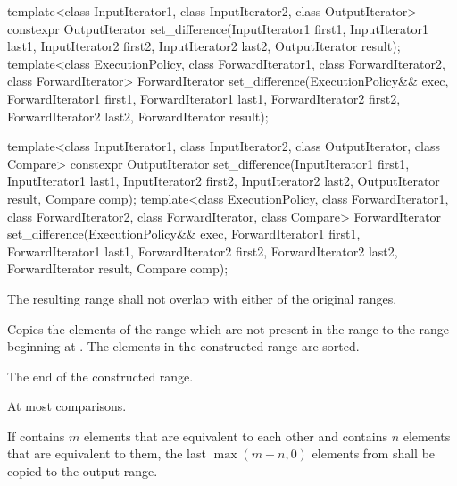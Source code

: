 %
\begin{itemdecl}
template<class InputIterator1, class InputIterator2,
         class OutputIterator>
  constexpr OutputIterator
    set_difference(InputIterator1 first1, InputIterator1 last1,
                   InputIterator2 first2, InputIterator2 last2,
                   OutputIterator result);
template<class ExecutionPolicy, class ForwardIterator1, class ForwardIterator2,
         class ForwardIterator>
  ForwardIterator
    set_difference(ExecutionPolicy&& exec,
                   ForwardIterator1 first1, ForwardIterator1 last1,
                   ForwardIterator2 first2, ForwardIterator2 last2,
                   ForwardIterator result);

template<class InputIterator1, class InputIterator2,
         class OutputIterator, class Compare>
  constexpr OutputIterator
    set_difference(InputIterator1 first1, InputIterator1 last1,
                   InputIterator2 first2, InputIterator2 last2,
                   OutputIterator result, Compare comp);
template<class ExecutionPolicy, class ForwardIterator1, class ForwardIterator2,
         class ForwardIterator, class Compare>
  ForwardIterator
    set_difference(ExecutionPolicy&& exec,
                   ForwardIterator1 first1, ForwardIterator1 last1,
                   ForwardIterator2 first2, ForwardIterator2 last2,
                   ForwardIterator result, Compare comp);
\end{itemdecl}

\begin{itemdescr}
\pnum
\requires
The resulting range shall not overlap with either of the original ranges.

\pnum
\effects
Copies the elements of the range
which are not present in the range
to the range beginning at
.
The elements in the constructed range are sorted.

\pnum
\returns
The end of the constructed range.

\pnum
\complexity
At most
comparisons.

\pnum
\remarks
If
contains $m$
elements that are equivalent to each other and
contains $n$
elements that are equivalent to them, the last
$\max(m - n, 0)$
elements from
shall be copied to the output range.
\end{itemdescr}

